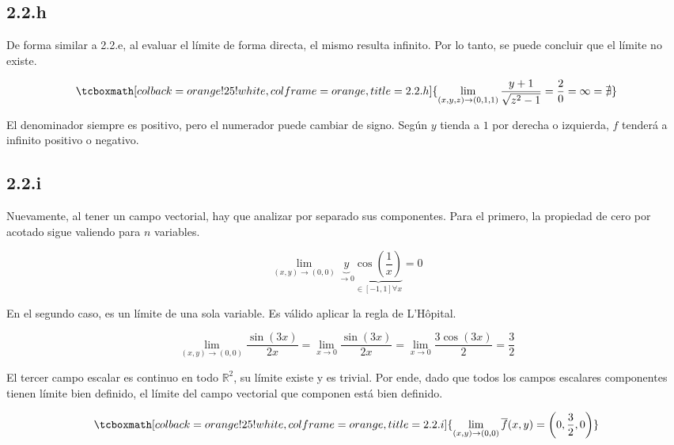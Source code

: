 \documentclass{article}
\renewcommand{\Bbb}{\mathbb}
\begin{document}
\subsection*{2.2.h}
\label{subsec:2.2.h}

De forma similar a 2.2.e, al evaluar el límite de forma directa, el mismo resulta infinito. Por lo tanto, se puede concluir que el límite no existe.

\begin{equation}
\tcboxmath[colback=orange!25!white,colframe=orange,title=2.2.h]
{ \lim_{(x,y,z) \rightarrow (0,1,1)} \frac{y+1}{\sqrt{z^2-1}} = \frac{2}{0} = \infty = \nexists }
\end{equation}

El denominador siempre es positivo, pero el numerador puede cambiar de signo. Según $y$ tienda a $1$ por derecha o izquierda, $f$ tenderá a infinito positivo o negativo.

\subsection*{2.2.i}
\label{subsec:2.2.i}

Nuevamente, al tener un campo vectorial, hay que analizar por separado sus componentes.
Para el primero, la propiedad de cero por acotado sigue valiendo para $n$ variables.

\begin{equation}
\lim_{(x,y) \rightarrow (0,0)} \underbrace{y}_{\rightarrow 0} \underbrace{ \cos \left( \frac{1}{x} \right) }_{\in [-1,1] \forall x} = 0
\end{equation}

En el segundo caso, es un límite de una sola variable. Es válido aplicar la regla de L'Hôpital.

\begin{equation}
\lim_{(x,y) \rightarrow (0,0)} \frac{\sin (3x)}{2x} = \lim_{x \rightarrow 0} \frac{\sin (3x)}{2x} = \lim_{x \rightarrow 0} \frac{3 \cos(3x)}{2} = \frac{3}{2}
\end{equation}

El tercer campo escalar es continuo en todo $\Bbb R^2$, su límite existe y es trivial. Por ende, dado que todos los campos escalares componentes tienen límite bien definido, el límite del campo vectorial que componen está bien definido.

\begin{equation}
\tcboxmath[colback=orange!25!white,colframe=orange,title=2.2.i]
{ \lim_{(x,y) \rightarrow (0,0) } \overline{f}(x,y) = \left( 0, \frac{3}{2}, 0 \right) }
\end{equation}
\end{document}
